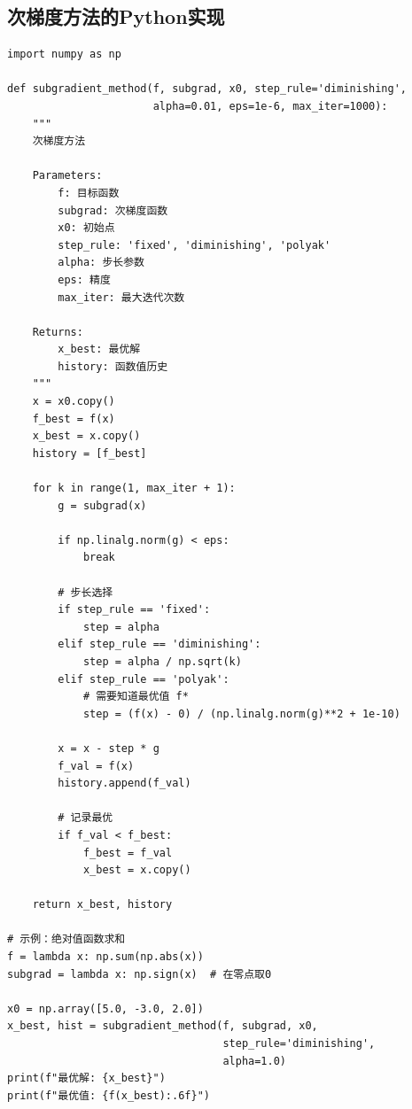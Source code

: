 \subsection{次梯度方法的Python实现}\label{sec:subgradient-code}

\begin{codebox}[次梯度方法]
\begin{lstlisting}
import numpy as np

def subgradient_method(f, subgrad, x0, step_rule='diminishing',
                       alpha=0.01, eps=1e-6, max_iter=1000):
    """
    次梯度方法
    
    Parameters:
        f: 目标函数
        subgrad: 次梯度函数
        x0: 初始点
        step_rule: 'fixed', 'diminishing', 'polyak'
        alpha: 步长参数
        eps: 精度
        max_iter: 最大迭代次数
    
    Returns:
        x_best: 最优解
        history: 函数值历史
    """
    x = x0.copy()
    f_best = f(x)
    x_best = x.copy()
    history = [f_best]
    
    for k in range(1, max_iter + 1):
        g = subgrad(x)
        
        if np.linalg.norm(g) < eps:
            break
        
        # 步长选择
        if step_rule == 'fixed':
            step = alpha
        elif step_rule == 'diminishing':
            step = alpha / np.sqrt(k)
        elif step_rule == 'polyak':
            # 需要知道最优值 f*
            step = (f(x) - 0) / (np.linalg.norm(g)**2 + 1e-10)
        
        x = x - step * g
        f_val = f(x)
        history.append(f_val)
        
        # 记录最优
        if f_val < f_best:
            f_best = f_val
            x_best = x.copy()
    
    return x_best, history

# 示例：绝对值函数求和
f = lambda x: np.sum(np.abs(x))
subgrad = lambda x: np.sign(x)  # 在零点取0

x0 = np.array([5.0, -3.0, 2.0])
x_best, hist = subgradient_method(f, subgrad, x0, 
                                  step_rule='diminishing',
                                  alpha=1.0)
print(f"最优解: {x_best}")
print(f"最优值: {f(x_best):.6f}")
\end{lstlisting}
\end{codebox}

